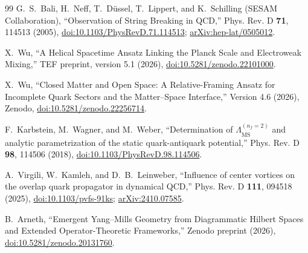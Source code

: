 \documentclass[10pt]{article}
\begin{document}
\begin{thebibliography}{99}
G.~S.~Bali, H.~Neff, T.~D\"ussel, T.~Lippert, and K.~Schilling (SESAM Collaboration),
``Observation of String Breaking in QCD,''
Phys. Rev. D \textbf{71}, 114513 (2005),
\href{https://doi.org/10.1103/PhysRevD.71.114513}{doi:10.1103/PhysRevD.71.114513};
\href{https://arxiv.org/abs/hep-lat/0505012}{arXiv:hep-lat/0505012}.

X.~Wu,
``A Helical Spacetime Ansatz Linking the Planck Scale and Electroweak Mixing,''
TEF preprint, version 5.1 (2026),
\href{https://doi.org/10.5281/zenodo.22101000}{doi:10.5281/zenodo.22101000}.

X.~Wu,
``Closed Matter and Open Space: A Relative-Framing Ansatz for Incomplete Quark Sectors and the Matter--Space Interface,''
Version 4.6 (2026), Zenodo,
\href{https://doi.org/10.5281/zenodo.22256714}{doi:10.5281/zenodo.22256714}.

F.~Karbstein, M.~Wagner, and M.~Weber,
``Determination of $\Lambda_{\overline{\mathrm{MS}}}^{(n_f=2)}$ and analytic parametrization of the static quark-antiquark potential,''
Phys. Rev. D \textbf{98}, 114506 (2018),
\href{https://doi.org/10.1103/PhysRevD.98.114506}{doi:10.1103/PhysRevD.98.114506}.

A.~Virgili, W.~Kamleh, and D.~B.~Leinweber,
``Influence of center vortices on the overlap quark propagator in dynamical QCD,''
Phys. Rev. D \textbf{111}, 094518 (2025),
\href{https://doi.org/10.1103/pvfs-91ks}{doi:10.1103/pvfs-91ks};
\href{https://arxiv.org/abs/2410.07585}{arXiv:2410.07585}.

B.~Arneth,
``Emergent Yang--Mills Geometry from Diagrammatic Hilbert Spaces and Extended Operator-Theoretic Frameworks,''
Zenodo preprint (2026),
\href{https://doi.org/10.5281/zenodo.20131760}{doi:10.5281/zenodo.20131760}.

\end{thebibliography}
\end{document}

